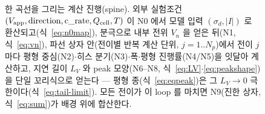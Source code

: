 \begin{figure}[t]
\caption{한 곡선을 그리는 계산 진행(spine). 외부 실험조건 $(V_{\mathrm{app}},\text{direction},\text{c\_rate},Q_{\mathrm{cell}},T)$
이 N0 에서 모델 입력 $(\sigma_d,|I|)$ 로 환산되고(식~\eqref{eq:n0map}), 분극으로 내부 전위 $V_n$ 을 얻은 뒤(N1,
식~\eqref{eq:vn}), 파선 상자 안(전이별 반복 계산 단위, $j=1..N_p$)에서 전이 $j$ 마다 평형 중심(N2)$\cdot$히스
분기(N3)$\cdot$폭$\cdot$평형 진행률(N4/N5)을 잇달아 계산하고, 지연 길이 $L_V$ 와 peak 모양(N6--N8,
식~\eqref{eq:LV}$\cdot$\eqref{eq:peakshape})을 단일 꼬리식으로 얻는다 --- 평형 종(식~\eqref{eq:eqpeak})은 그 $L_V\!\to\!0$ 극한이다(식~\eqref{eq:tail-limit}).
모든 전이가 이 loop 를 마치면 N9(진한 상자, 식~\eqref{eq:sum})가 배경 위에 합산한다.}
\label{fig:spine}
\end{figure}

\tableofcontents
\newpage


